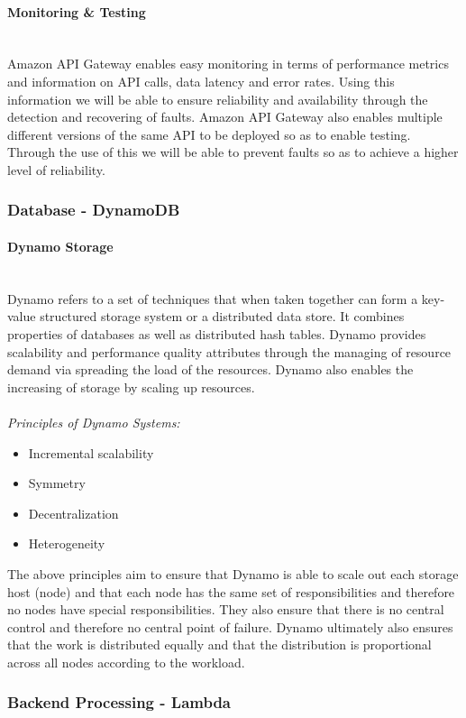 \documentclass{article}
\begin{document}
		\paragraph{Monitoring \& Testing}\mbox{}\\
		Amazon API Gateway enables easy monitoring in terms of performance metrics and information on API calls, data latency and error rates. Using this information we will be able to ensure reliability and availability through the detection and recovering of faults. Amazon API Gateway also enables multiple different versions of the same API to be deployed so as to enable testing. Through the use of this we will be able to prevent faults so as to achieve a higher level of reliability.
	\subsubsection{Database - DynamoDB}
		\paragraph{Dynamo Storage}\mbox{}\\
		Dynamo refers to a set of techniques that when taken together can form a key-value structured storage system or a distributed data store. It combines properties of databases as well as distributed hash tables. Dynamo provides scalability and performance quality attributes through the managing of resource demand via spreading the load of the resources. Dynamo also enables the increasing of storage by scaling up resources.\\\\
		\textit{Principles of Dynamo Systems:}
		\begin{itemize}
			\item Incremental scalability
			\item Symmetry
			\item Decentralization
			\item Heterogeneity
		\end{itemize}
		The above principles aim to ensure that Dynamo is able to scale out each storage host (node) and that each node has the same set of responsibilities and therefore no nodes have special responsibilities. They also ensure that there is no central control and therefore no central point of failure. Dynamo ultimately also ensures that the work is distributed equally and that the distribution is proportional across all nodes according to the workload.
	\subsubsection{Backend Processing - Lambda}
\end{document}
